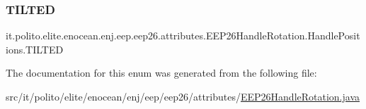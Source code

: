 \subsubsection{\texorpdfstring{T\+I\+L\+T\+ED}{TILTED}}
{\footnotesize\ttfamily it.\+polito.\+elite.\+enocean.\+enj.\+eep.\+eep26.\+attributes.\+E\+E\+P26\+Handle\+Rotation.\+Handle\+Positions.\+T\+I\+L\+T\+ED}



The documentation for this enum was generated from the following file\+:\begin{DoxyCompactItemize}
\item 
src/it/polito/elite/enocean/enj/eep/eep26/attributes/\hyperlink{_e_e_p26_handle_rotation_8java}{E\+E\+P26\+Handle\+Rotation.\+java}\end{DoxyCompactItemize}
